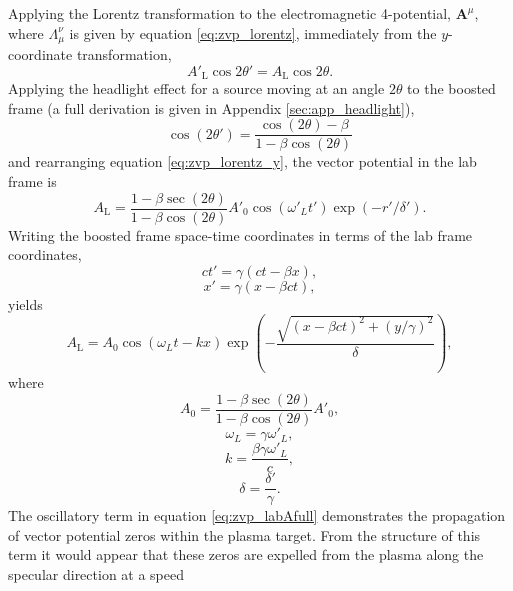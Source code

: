 Applying the Lorentz transformation to the electromagnetic 4-potential, $\mathbf{A}^\mu$, where $\Lambda_\mu^\nu$ is given by equation \ref{eq:zvp_lorentz}, immediately from the $y$-coordinate transformation,
\begin{equation}\label{eq:zvp_lorentz_y}
	A'_\mathrm{L}\cos{2\theta'} = A_\mathrm{L}\cos{2\theta}.
\end{equation}
Applying the headlight effect for a source moving at an angle $2\theta$ to the boosted frame (a full derivation is given in Appendix \ref{sec:app_headlight}),
\begin{equation}
	\cos{(2\theta')} = \frac{\cos{(2\theta)}-\beta}{1 - \beta\cos{(2\theta)}}
\end{equation}
and rearranging equation \ref{eq:zvp_lorentz_y}, the vector potential in the lab frame is
\begin{equation}\label{eq:zvp_labA}
	A_\mathrm{L} = \frac{1-\beta \sec{(2\theta)}}{1 - \beta\cos{(2\theta)}} A'_0\cos{(\omega'_L t')}\exp{(-r'/\delta')}.
\end{equation}
Writing the boosted frame space-time coordinates in terms of the lab frame coordinates,
\begin{equation}
	ct' = \gamma(ct-\beta x),
\end{equation}
\begin{equation}
	x' = \gamma(x-\beta ct),
\end{equation}
yields
\begin{equation}\label{eq:zvp_labAfull}
	A_\mathrm{L} =  A_0\cos{(\omega_L t - kx)}\exp{\left(-\frac{\sqrt{(x-\beta ct)^2+(y/\gamma)^2}}{\delta}\right)},
\end{equation}
where
\begin{equation}
	A_0 = \frac{1-\beta \sec{(2\theta)}}{1 - \beta\cos{(2\theta)}}A'_0,
\end{equation}
\begin{equation}
	\omega_L = \gamma \omega'_L,
\end{equation}
\begin{equation}
	k = \frac{\beta \gamma\omega'_L}{c},
\end{equation}
\begin{equation}
	\delta = \frac{\delta'}{\gamma}.
\end{equation}
The oscillatory term in equation \ref{eq:zvp_labAfull} demonstrates the propagation of vector potential zeros within the plasma target. From the structure of this term it would appear that these zeros are expelled from the plasma along the specular direction at a speed
